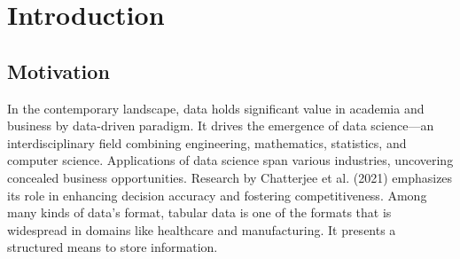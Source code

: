 \chapter{Introduction} \label{chap:intro}

\section{Motivation}
%

In the contemporary landscape, data holds significant value in academia and business by data-driven paradigm.
It drives the emergence of data science—an interdisciplinary field combining engineering, mathematics, statistics, and computer science.
Applications of data science span various industries, uncovering concealed business opportunities.
Research by Chatterjee et al. (2021) emphasizes its role in enhancing decision accuracy and fostering competitiveness.
Among many kinds of data's format, tabular data is one of the formats that is widespread in domains like healthcare and manufacturing.
It presents a structured means to store information.

